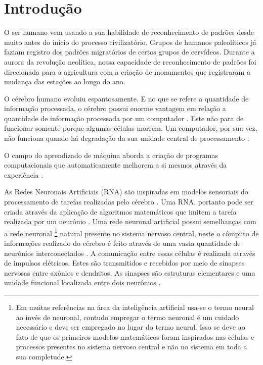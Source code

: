 \chapter{Introdução}
\label{introducao}

O ser humano vem usando a sua habilidade de reconhecimento de padrões desde  muito antes do início do processo civilizatório. Grupos de humanos paleolíticos já faziam registro dos padrões migratórios de certos grupos de cervídeos. Durante a aurora da revolução neolítica, nossa capacidade de reconhecimento de padrões foi direcionada para a agricultura com a criação de monumentos que registraram a mudança das estações ao longo do ano.

O cérebro humano evoluiu espantosamente. E no que se refere a quantidade de informação processada, o cérebro possui enorme vantagem em relação a quantidade de informação processada por um computador \citep{Hall2014}. Este não para de funcionar somente porque algumas células morrem. Um computador, por sua vez, não funciona quando há degradação da sua unidade central de processamento \citep{Mao1996}.

O campo do aprendizado de máquina aborda a criação de programas computacionais que automaticamente melhorem a si mesmos através da experiência \citep{Michie1994,Levy1997,MacKay2005}. 


As Redes Neuronais Artificiais (RNA) são inspiradas em modelos sensoriais do processamento de tarefas realizadas pelo cérebro \citep{Hagan1996}. Uma RNA, portanto pode ser criada através da aplicação de algoritmos matemáticos que imitem a tarefa realizada por um neurônio \citep{Nedjah2016}. Uma rede neuronal artificial possui semelhanças com a rede neuronal \footnote{ Em muitas referências na área  da inteligência artificial usa-se o termo neural ao invés de neuronal, contudo empregar o termo neuronal é um cuidado necessário e deve ser empregado no lugar do termo neural. Isso se deve ao fato de que os primeiros modelos matemáticos foram inspirados nas células e processos presentes no sistema nervoso central e não no sistema em toda a sua completude.  } natural presente no sistema nervoso central, neste o cômputo de informações realizado do cérebro é feito através de uma vasta quantidade de neurônios interconectados \citep{Feldman1988,Poulton2002}. A comunicação entre essas células é realizada através de impulsos elétricos. Estes são transmitidos e recebidos por meio de sinapses nervosas entre axônios e dendritos. As sinapses são estruturas elementares e uma unidade funcional localizada entre dois neurônios \citep{Krogh2008}. 

